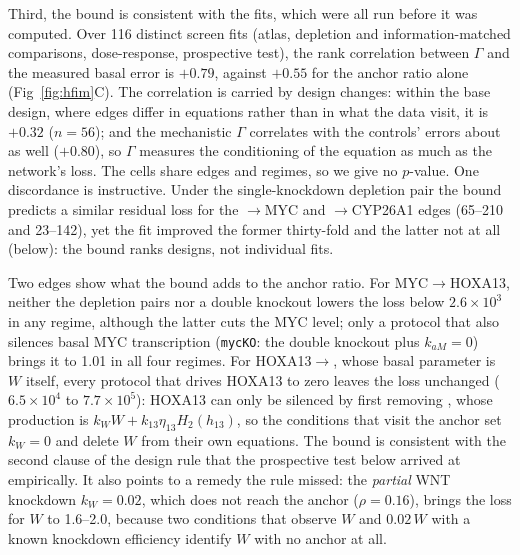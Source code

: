 Third, the bound is consistent with the fits, which were all run before it was
computed. Over 116 distinct screen fits (atlas, depletion and
information-matched comparisons, dose-response, prospective test), the rank
correlation between $\Gamma$ and the measured basal error is $+0.79$, against $+0.55$
for the anchor ratio alone (Fig~\ref{fig:hfim}C). The correlation is carried by
design changes: within the base design, where edges differ in equations rather
than in what the data visit, it is $+0.32$ ($n=56$); and the mechanistic $\Gamma$
correlates with the controls' errors about as well ($+0.80$), so $\Gamma$ measures
the conditioning of the equation as much as the network's loss. The cells share
edges and regimes, so we give no $p$-value. One discordance is instructive.
Under the single-knockdown depletion pair the bound predicts a similar
residual loss for the \bcat{}$\to$MYC and \bcat{}$\to$CYP26A1 edges (65--210 and
23--142), yet the fit improved the former thirty-fold and the latter not at all
(below): the bound ranks designs, not individual fits.

Two edges show what the bound adds to the anchor ratio. For MYC$\to$HOXA13,
neither the depletion pairs nor a \bcat{} double knockout lowers the loss below
$2.6\times10^3$ in any regime, although the latter cuts the MYC level; only a
protocol that also silences basal MYC transcription (\texttt{mycKO}: the
\bcat{} double knockout plus $k_{aM}=0$) brings it to 1.01 in all four regimes.
For HOXA13$\to$\bcat{}, whose basal parameter is $W$ itself, every protocol
that drives HOXA13 to zero leaves the loss unchanged ($6.5\times10^4$ to
$7.7\times10^5$): HOXA13 can only be silenced by first removing \bcat{}, whose
production is $k_WW+k_{13}\eta_{13}H_2(h_{13})$, so the conditions that visit
the anchor set $k_W=0$ and delete $W$ from their own equations. The bound is
consistent with the second clause of the design rule that the prospective test
below arrived at empirically. It also points to a remedy the rule missed: the
\emph{partial} WNT knockdown $k_W=0.02$, which does not reach the anchor
($\rho=0.16$), brings the loss for $W$ to 1.6--2.0, because two conditions that
observe $W$ and $0.02\,W$ with a known knockdown efficiency identify $W$ with no
anchor at all.

